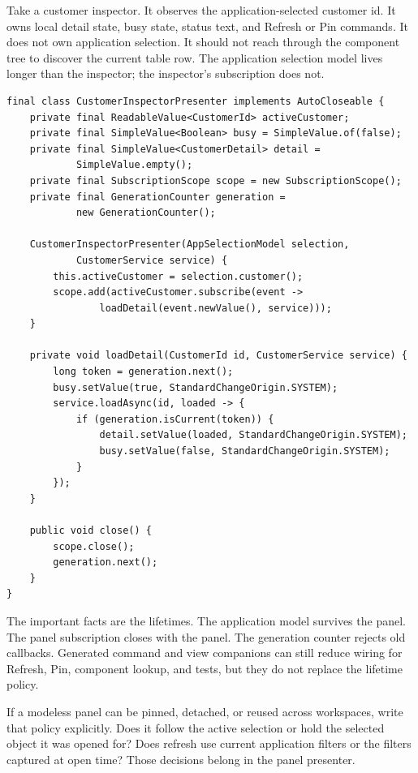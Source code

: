 Take a customer inspector. It observes the application-selected customer id. It owns local detail state, busy state, status text, and Refresh or Pin commands. It does not own application selection. It should not reach through the component tree to discover the current table row. The application selection model lives longer than the inspector; the inspector's subscription does not.

\begin{lstlisting}[caption={A modeless presenter observes shared state explicitly.}]
final class CustomerInspectorPresenter implements AutoCloseable {
    private final ReadableValue<CustomerId> activeCustomer;
    private final SimpleValue<Boolean> busy = SimpleValue.of(false);
    private final SimpleValue<CustomerDetail> detail =
            SimpleValue.empty();
    private final SubscriptionScope scope = new SubscriptionScope();
    private final GenerationCounter generation =
            new GenerationCounter();

    CustomerInspectorPresenter(AppSelectionModel selection,
            CustomerService service) {
        this.activeCustomer = selection.customer();
        scope.add(activeCustomer.subscribe(event ->
                loadDetail(event.newValue(), service)));
    }

    private void loadDetail(CustomerId id, CustomerService service) {
        long token = generation.next();
        busy.setValue(true, StandardChangeOrigin.SYSTEM);
        service.loadAsync(id, loaded -> {
            if (generation.isCurrent(token)) {
                detail.setValue(loaded, StandardChangeOrigin.SYSTEM);
                busy.setValue(false, StandardChangeOrigin.SYSTEM);
            }
        });
    }

    public void close() {
        scope.close();
        generation.next();
    }
}
\end{lstlisting}

The important facts are the lifetimes. The application model survives the panel. The panel subscription closes with the panel. The generation counter rejects old callbacks. Generated command and view companions can still reduce wiring for Refresh, Pin, component lookup, and tests, but they do not replace the lifetime policy.

If a modeless panel can be pinned, detached, or reused across workspaces, write that policy explicitly. Does it follow the active selection or hold the selected object it was opened for? Does refresh use current application filters or the filters captured at open time? Those decisions belong in the panel presenter.

